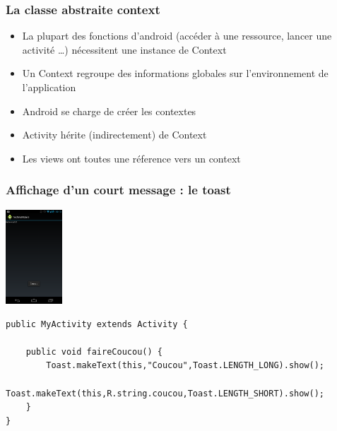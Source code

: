 \documentclass{beamer}
\begin{document}
\begin{frame}[fragile]
\frametitle{La classe abstraite context}
\begin{itemize}
 \item La plupart des fonctions d'android (accéder à une ressource,
 lancer une activité \ldots) nécessitent une instance de Context
 \item Un Context regroupe des informations globales sur l'environnement de
 l'application
 \item Android se charge de créer les contextes
 \item Activity hérite (indirectement) de Context
 \item Les views ont toutes une réference vers un context
 \end{itemize}
\end{frame}

\begin{frame}[fragile]
\frametitle{Affichage d'un court message : le toast}
\includegraphics[width=60pt]{coucou.png}
\begin{lstlisting}
public MyActivity extends Activity {
    
    public void faireCoucou() {
        Toast.makeText(this,"Coucou",Toast.LENGTH_LONG).show();
        Toast.makeText(this,R.string.coucou,Toast.LENGTH_SHORT).show();
    }	
}
\end{lstlisting}
\end{frame}
\end{document}
